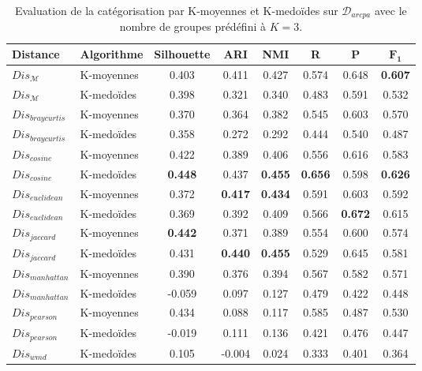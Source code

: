 \begin{table}[!htb]
	\centering \footnotesize
	\begin{tabular}[pos]{|l|l|c|c|c|c|c|c|}
		\hline
		{Distance}& {Algorithme}& {Silhouette}& {ARI} & {NMI} & {R} & {P} & $\mathbf{F_1}$ \\ \hline
		 $Dis_\mathcal{M}$          & K-moyennes    & 0.403      & 0.411 & 0.427 & 0.574  & 0.648     & \textbf{0.607} \\ \hline
		 $Dis_\mathcal{M}$          & K-medoïdes  & 0.398      & 0.321 & 0.340 & 0.483  & 0.591     & 0.532 \\ \hline
		 $Dis_{braycurtis}$ & K-moyennes    & 0.370      & 0.364 & 0.382 & 0.545  & 0.603     & 0.570 \\ \hline
		 $Dis_{braycurtis}$ & K-medoïdes  & 0.358      & 0.272 & 0.292 & 0.444  & 0.540     & 0.487 \\ \hline
		 $Dis_{cosine}$     & K-moyennes    & 0.422     & 0.389 & 0.406 & 0.556  & 0.616     & 0.583 \\ \hline
		 $Dis_{cosine}$     & K-medoïdes  & \textbf{0.448}      & 0.437 & \textbf{0.455} & \textbf{0.656}  & 0.598     & \textbf{0.626} \\ \hline
		 $Dis_{euclidean}$  & K-moyennes    & 0.372      & \textbf{0.417} & \textbf{0.434} & 0.591  & 0.603     & 0.592 \\ \hline
		 $Dis_{euclidean}$  & K-medoïdes  & 0.369      & 0.392 & 0.409 & 0.566  & \textbf{0.672}     & 0.615 \\ \hline
		 $Dis_{jaccard}$    & K-moyennes    & \textbf{0.442}      & 0.371 & 0.389 & 0.554  & 0.600     & 0.574 \\ \hline
		 $Dis_{jaccard}$    & K-medoïdes  & 0.431      & \textbf{0.440} & \textbf{0.455} & 0.529  & 0.645     & 0.581 \\ \hline
		 $Dis_{manhattan}$  & K-moyennes    & 0.390      & 0.376 & 0.394 & 0.567  & 0.582     & 0.571 \\ \hline
		 $Dis_{manhattan}$  & K-medoïdes  & -0.059     & 0.097 & 0.127 & 0.479  & 0.422     & 0.448 \\ \hline
		 $Dis_{pearson}$    & K-moyennes    & 0.434      & 0.088 & 0.117 & 0.585  & 0.487     & 0.530 \\ \hline
		 $Dis_{pearson}$    & K-medoïdes  & -0.019     & 0.111 & 0.136 & 0.421  & 0.476     & 0.447 \\ \hline
		 $Dis_{wmd}$    & K-medoïdes  & 0.105 & -0.004&	0.024&	0.333&	0.401&	0.364 \\ \hline
	\end{tabular}
	\caption{Evaluation de la catégorisation par K-moyennes et K-medoïdes sur $\mathcal{D}_{arcpa}$ avec le nombre de groupes prédéfini à $K=3$.} \label{tab:similarite:validation-supervisee-k3}
\end{table}

